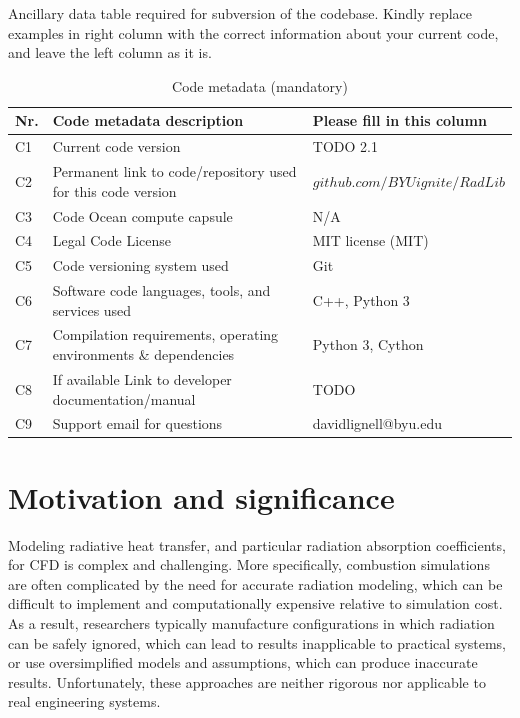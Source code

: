 \documentclass[preprint,12pt, a4paper]{elsarticle}
\begin{document}
Ancillary data table required for subversion of the codebase. Kindly replace examples in right column with the correct information about your current code, and leave the left column as it is.

\begin{table}[H]
\begin{tabular}{|l|p{6.5cm}|p{6.5cm}|}
\hline
\textbf{Nr.} & \textbf{Code metadata description} & \textbf{Please fill in this column} \\
\hline
C1 & Current code version & TODO 2.1 \\
\hline
C2 & Permanent link to code/repository used for this code version & $github.com/BYUignite/RadLib$ \\
\hline
C3 & Code Ocean compute capsule & N/A \\
\hline
C4 & Legal Code License   & MIT license (MIT) \\
\hline
C5 & Code versioning system used & Git \\
\hline
C6 & Software code languages, tools, and services used & C++, Python 3 \\
\hline
C7 & Compilation requirements, operating environments \& dependencies & Python 3, Cython \\
\hline
C8 & If available Link to developer documentation/manual & TODO \\
\hline
C9 & Support email for questions & davidlignell@byu.edu \\
\hline
\end{tabular}
\caption{Code metadata (mandatory)}
\label{} 
\end{table}


\linenumbers


\section{Motivation and significance}
\label{s:motivation}

Modeling radiative heat transfer, and particular radiation absorption coefficients, for CFD is complex and challenging. More specifically, combustion simulations are often complicated by the need for accurate radiation modeling, which can be difficult to implement and computationally expensive relative to simulation cost. As a result, researchers typically manufacture configurations in which radiation can be safely ignored, which can lead to results inapplicable to practical systems, or use oversimplified models and assumptions, which can produce inaccurate results. Unfortunately, these approaches are neither rigorous nor applicable to real engineering systems. 
\end{document}
